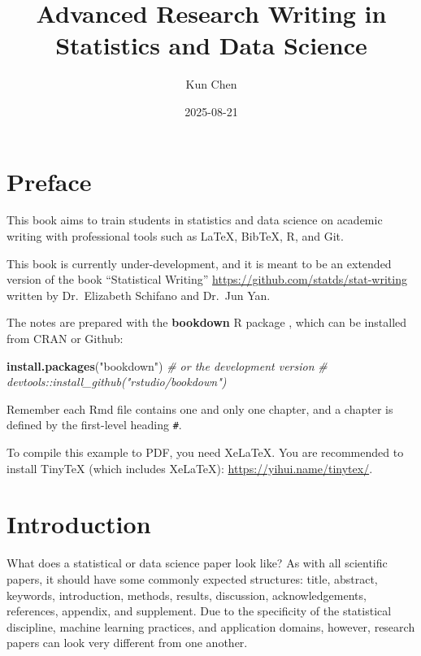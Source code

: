 \documentclass[
]{book}
\title{Advanced Research Writing in Statistics and Data Science}
\author{Kun Chen}
\date{2025-08-21}
\newenvironment{Shaded}{\begin{snugshade}}{\end{snugshade}}
\newcommand{\CommentTok}[1]{\textcolor[rgb]{0.56,0.35,0.01}{\textit{#1}}}
\newcommand{\FunctionTok}[1]{\textcolor[rgb]{0.13,0.29,0.53}{\textbf{#1}}}
\newcommand{\NormalTok}[1]{#1}
\newcommand{\StringTok}[1]{\textcolor[rgb]{0.31,0.60,0.02}{#1}}
\theoremstyle{definition}
\theoremstyle{definition}
\theoremstyle{definition}
\theoremstyle{definition}
\theoremstyle{remark}
\begin{document}
\maketitle

{
\setcounter{tocdepth}{1}
\tableofcontents
}
\chapter*{Preface}\label{preface}

This book aims to train students in statistics and data science on academic
writing with professional tools such as LaTeX, BibTeX, R, and Git.

This book is currently under-development, and it is meant to be
an extended version of the book ``Statistical Writing'' \url{https://github.com/statds/stat-writing} written by Dr.~Elizabeth Schifano and Dr.~Jun Yan.

The notes are prepared with the \textbf{bookdown} R package \citep{xie2016bookdown},
which can be installed from CRAN or Github:

\begin{Shaded}
\begin{Highlighting}[]
\FunctionTok{install.packages}\NormalTok{(}\StringTok{"bookdown"}\NormalTok{)}
\CommentTok{\# or the development version}
\CommentTok{\# devtools::install\_github("rstudio/bookdown")}
\end{Highlighting}
\end{Shaded}

Remember each Rmd file contains one and only one chapter, and a chapter is
defined by the first-level heading \texttt{\#}.

To compile this example to PDF, you need XeLaTeX. You are recommended to install
TinyTeX (which includes XeLaTeX): \url{https://yihui.name/tinytex/}.

\chapter{Introduction}\label{intro}

What does a statistical or data science paper look like? As with all scientific papers, it should have some commonly expected structures: title, abstract, keywords, introduction, methods, results, discussion, acknowledgements, references, appendix, and supplement. Due to the specificity of the statistical discipline, machine learning practices, and application domains, however, research papers can look very different from one another.
\end{document}
